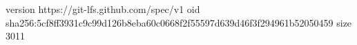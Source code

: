 version https://git-lfs.github.com/spec/v1
oid sha256:5cf8ff3931c9c99d126b8eba60c0668f2f55597d639d46f3f294961b52050459
size 3011
